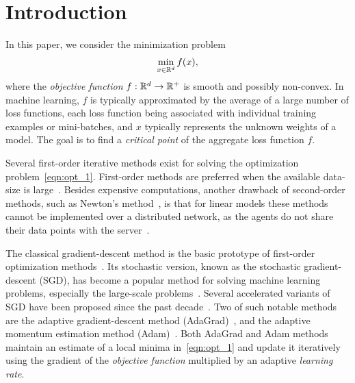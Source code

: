 \section{Introduction}
\label{sec:intro}

In this paper, we consider the minimization problem
\begin{align}
    \min_{x \in \mathbb{R}^d} f(x), \label{eqn:opt_1}
\end{align}
where the {\em objective function} $f: \mathbb{R}^d \to \mathbb{R}^+$ is smooth and possibly non-convex. In machine learning, $f$ is typically approximated by the average of a large number of loss functions, each loss function being associated with individual training examples or mini-batches, and $x$ typically represents the unknown weights of a model. The goal is to find a {\em critical point} of the aggregate loss function $f$.

Several first-order iterative methods exist for solving the optimization problem~\eqref{eqn:opt_1}. First-order methods are preferred when the available data-size is large~\cite{bottou2018optimization}. Besides expensive computations, another drawback of second-order methods, such as Newton's method~\cite{kelley1999iterative}, is that for linear models these methods cannot be implemented over a distributed network, as the agents do not share their data points with the server~\cite{chakrabarti2020iterative}.

The classical gradient-descent method is the basic prototype of first-order optimization methods~\cite{bertsekas1989parallel}. Its stochastic version, known as the stochastic gradient-descent (SGD), has become a popular method for solving machine learning problems, especially the large-scale problems~\cite{bottou2018optimization}. Several accelerated variants of SGD have been proposed since the past decade~\cite{duchi2011adaptive, kingma2014adam, zeiler2012adadelta, reddi2019convergence, dozat2016incorporating}. Two of such notable methods are the adaptive gradient-descent method (AdaGrad)~\cite{duchi2011adaptive}, and the adaptive momentum estimation method (Adam)~\cite{kingma2014adam}. Both AdaGrad and Adam methods maintain an estimate of a local minima in~\eqref{eqn:opt_1} and update it iteratively using the gradient of the {\em objective function} multiplied by an adaptive {\em learning rate}.

